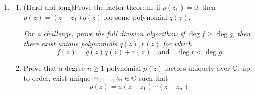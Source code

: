 \begin{exercises*}
\begin{enumerate}
  \item\begin{enumerate}
    \item (Hard and long)\quad Prove the factor theorem: if $p(z_1)=0$, then $p(z)=(z-z_1)q(z)$ for some polynomial $q(z)$.\par
    \emph{For a challenge, prove the full division algorithm: if $\deg f\ge \deg g$, then there exist unique polynomials $q(z),r(z)$ for which
    \[f(z)=g(z)q(z)+r(z)\quad\text{and}\quad \deg r<\deg g\]}
    \item Prove that a degree $n\ge 1$ polynomial $p(z)$ factors uniquely over $\mathbb{C}$: up to order, exist unique $z_1,\ldots,z_n\in\mathbb{C}$ such that
    \[p(z)=a(z-z_1)\cdots(z-z_n)\]
  \end{enumerate}
\end{enumerate}
\end{exercises*}
